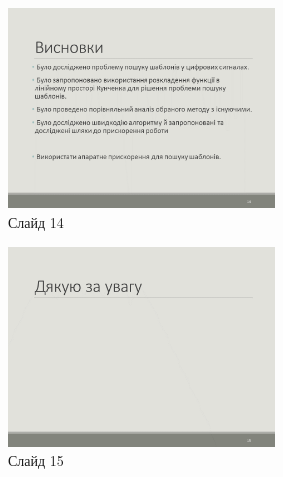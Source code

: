 \documentclass{thesis_utf8}
\begin{document}
\begin{figure}[h]
    \centering
    \includegraphics[width=0.63\textwidth]{slides/slide14.png}
    \caption{Слайд 14}
\end{figure}

\begin{figure}[h]
    \centering
    \includegraphics[width=0.63\textwidth]{slides/slide15.png}
    \caption{Слайд 15}
\end{figure}
\end{document}
